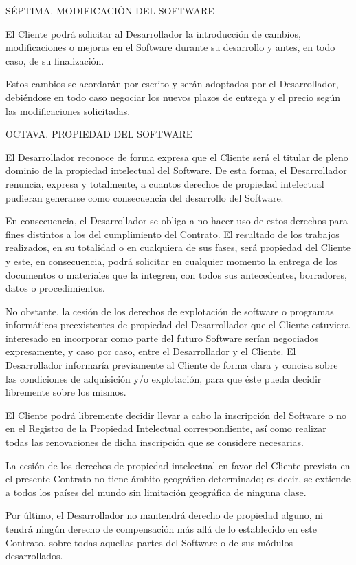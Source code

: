 \documentclass[a4paper,11pt]{report}
\begin{document}
	SÉPTIMA. MODIFICACIÓN DEL SOFTWARE
	
	El Cliente podrá solicitar al Desarrollador la introducción de cambios,
	modificaciones o mejoras en el Software durante su desarrollo y antes,
	en todo caso, de su finalización.
	
	Estos cambios se acordarán por escrito y serán adoptados por el
	Desarrollador, debiéndose en todo caso negociar los nuevos plazos de
	entrega y el precio según las modificaciones solicitadas.
	
	OCTAVA. PROPIEDAD DEL SOFTWARE
	
	El Desarrollador reconoce de forma expresa que el Cliente será el
	titular de pleno dominio de la propiedad intelectual del Software. De
	esta forma, el Desarrollador renuncia, expresa y totalmente, a cuantos
	derechos de propiedad intelectual pudieran generarse como consecuencia
	del desarrollo del Software.
	
	En consecuencia, el Desarrollador se obliga a no hacer uso de estos
	derechos para fines distintos a los del cumplimiento del Contrato. El
	resultado de los trabajos realizados, en su totalidad o en cualquiera de
	sus fases, será propiedad del Cliente y este, en consecuencia, podrá
	solicitar en cualquier momento la entrega de los documentos o materiales
	que la integren, con todos sus antecedentes, borradores, datos o
	procedimientos.
	
	No obstante, la cesión de los derechos de explotación de software o
	programas informáticos preexistentes de propiedad del Desarrollador que
	el Cliente estuviera interesado en incorporar como parte del futuro
	Software serían negociados expresamente, y caso por caso, entre el
	Desarrollador y el Cliente. El Desarrollador informaría previamente al
	Cliente de forma clara y concisa sobre las condiciones de adquisición
	y/o explotación, para que éste pueda decidir libremente sobre los
	mismos.
	
	El Cliente podrá libremente decidir llevar a cabo la inscripción del
	Software o no en el Registro de la Propiedad Intelectual
	correspondiente, así como realizar todas las renovaciones de dicha
	inscripción que se considere necesarias.
	
	La cesión de los derechos de propiedad intelectual en favor del Cliente
	prevista en el presente Contrato no tiene ámbito geográfico determinado;
	es decir, se extiende a todos los países del mundo sin limitación
	geográfica de ninguna clase.
	
	Por último, el Desarrollador no mantendrá derecho de propiedad alguno,
	ni tendrá ningún derecho de compensación más allá de lo establecido en
	este Contrato, sobre todas aquellas partes del Software o de sus módulos
	desarrollados.
	
\end{document}
